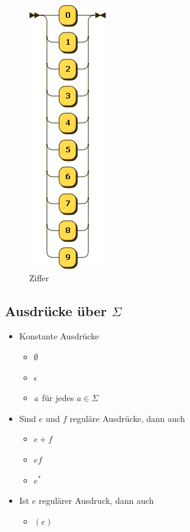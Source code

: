 \documentclass{scrartcl}
\begin{document}
\begin{figure}[ht]
	\centering
	\includegraphics[scale=.5]{figures/Ziffer.png}
	\caption{Ziffer}
	\label{ziffer}
\end{figure}

\subsection{Ausdrücke über $\Sigma$}

\begin{itemize}
	\item Konstante Ausdrücke
	\begin{itemize}
		\item $\emptyset$
		\item $\epsilon$
		\item $a \hfill$ für jedes $a \in \Sigma$
	\end{itemize}
	\item Sind $e$ und $f$ reguläre Ausdrücke, dann auch
	\begin{itemize}
		\item $e + f$
		\item $ef$
		\item $e^*$
	\end{itemize}
	\item Ist $e$ regulärer Ausdruck, dann auch
	\begin{itemize}
		\item $(e)$
	\end{itemize}
\end{itemize}
\end{document}

